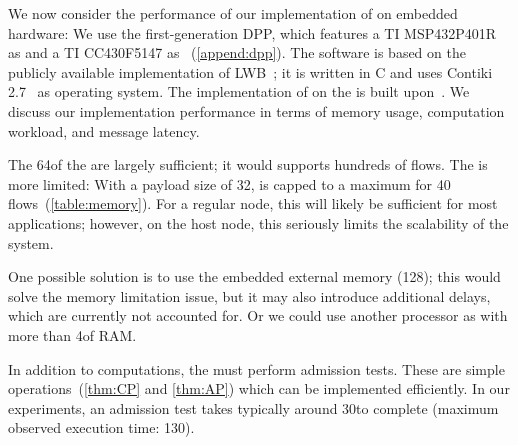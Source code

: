 We now consider the performance of our implementation of \DRP on embedded hardware: We use the first-generation DPP, which features a TI MSP432P401R as \AP and a TI CC430F5147 as \CP~(\cref{append:dpp}).
The software is based on the publicly available implementation of LWB~\cite{Code_LWB}; it is written in C and uses Contiki 2.7~\cite{contiki} as operating system.
The implementation of \blink on the \AP is built upon~\cite{acevedo2016Realtime}.
%
We discuss our implementation performance in terms of memory usage, computation workload, and message latency.


The 64\kB of the \AP are largely sufficient; it would supports hundreds of flows. The \CP is more limited: With a payload size of 32\bytes, \CP is capped to a maximum for 40 flows~(\cref{table:memory}). For a regular node, this will likely be sufficient for most applications; however, on the host node, this seriously limits the scalability of the system.

One possible solution is to use the embedded external memory (128\kB); this would solve the memory limitation issue, but it may also introduce additional delays, which are currently not accounted for. Or we could use another processor as \CP with more than 4\kB of RAM.

\begin{table}
	\centering
	\caption{Memory available and required for our implementation of \DRP.
	}
	\label{table:memory}
	{\smaller}
\end{table}

\pagebreak


In addition to \blink computations, the \APs must perform \DRP admission tests. These are simple operations~(\cref{thm:CP} and \ref{thm:AP}) which can be implemented efficiently. In our experiments, an admission test takes typically around 30\ms to complete (maximum observed execution time: 130\ms).


